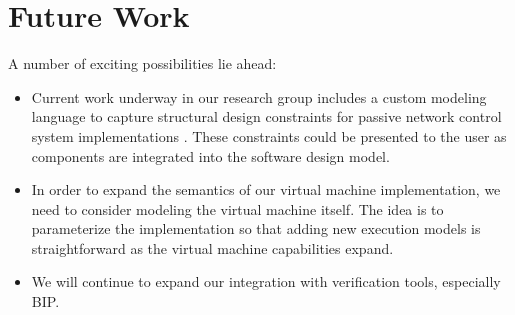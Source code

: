 \section{Future Work}

A number of exciting possibilities lie ahead:

\begin{itemize}

\item Current work underway in our research group includes a custom modeling language to capture structural design constraints for passive network control system implementations \cite{ncs:mic}.  These constraints could be presented to the user as components are integrated into the software design model.

\item In order to expand the semantics of our virtual machine implementation, we need to consider modeling the virtual machine itself.  The idea is to parameterize the implementation so that adding new execution models is straightforward as the virtual machine capabilities expand.

\item We will continue to expand our integration with verification tools, especially BIP.

\end{itemize}